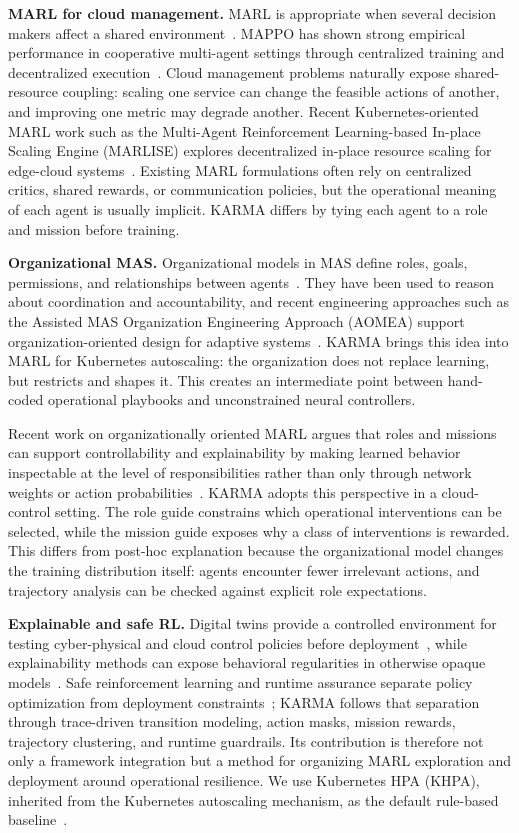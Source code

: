\documentclass[journal]{IEEEtran}
\begin{document}
\textbf{MARL for cloud management.} MARL is appropriate when several decision makers affect a shared environment~\cite{Shoham2009MAS}. MAPPO has shown strong empirical performance in cooperative multi-agent settings through centralized training and decentralized execution~\cite{Yu2022}. Cloud management problems naturally expose shared-resource coupling: scaling one service can change the feasible actions of another, and improving one metric may degrade another. Recent Kubernetes-oriented MARL work such as the Multi-Agent Reinforcement Learning-based In-place Scaling Engine (MARLISE) explores decentralized in-place resource scaling for edge-cloud systems~\cite{Prodanov2025MARLISE}. Existing MARL formulations often rely on centralized critics, shared rewards, or communication policies, but the operational meaning of each agent is usually implicit. KARMA differs by tying each agent to a role and mission before training.

\textbf{Organizational MAS.} Organizational models in MAS define roles, goals, permissions, and relationships between agents~\cite{Jennings1998,hubner2002moise,Boissier2007OOP}. They have been used to reason about coordination and accountability, and recent engineering approaches such as the Assisted MAS Organization Engineering Approach (AOMEA) support organization-oriented design for adaptive systems~\cite{soule2024aomea}. KARMA brings this idea into MARL for Kubernetes autoscaling: the organization does not replace learning, but restricts and shapes it. This creates an intermediate point between hand-coded operational playbooks and unconstrained neural controllers.

Recent work on organizationally oriented MARL argues that roles and missions can support controllability and explainability by making learned behavior inspectable at the level of responsibilities rather than only through network weights or action probabilities~\cite{soule2025moisemarl}. KARMA adopts this perspective in a cloud-control setting. The role guide constrains which operational interventions can be selected, while the mission guide exposes why a class of interventions is rewarded. This differs from post-hoc explanation because the organizational model changes the training distribution itself: agents encounter fewer irrelevant actions, and trajectory analysis can be checked against explicit role expectations.

\textbf{Explainable and safe RL.} Digital twins provide a controlled environment for testing cyber-physical and cloud control policies before deployment~\cite{fuller2020digital}, while explainability methods can expose behavioral regularities in otherwise opaque models~\cite{guidotti2018survey,biran2017explanation}. Safe reinforcement learning and runtime assurance separate policy optimization from deployment constraints~\cite{garcia2015safe}; KARMA follows that separation through trace-driven transition modeling, action masks, mission rewards, trajectory clustering, and runtime guardrails. Its contribution is therefore not only a framework integration but a method for organizing MARL exploration and deployment around operational resilience. We use Kubernetes HPA (KHPA), inherited from the Kubernetes autoscaling mechanism, as the default rule-based baseline~\cite{Toka2020}.
\end{document}
